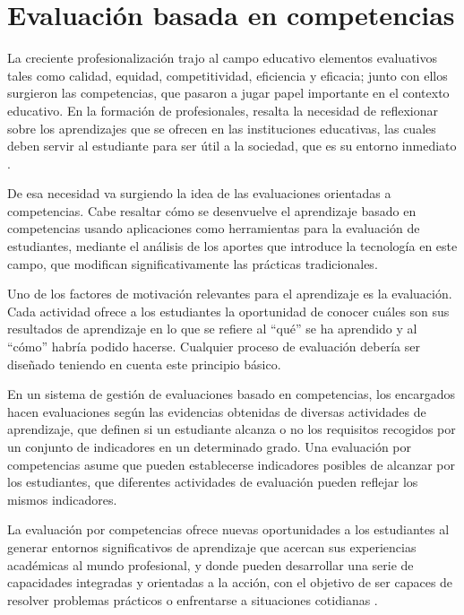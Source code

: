 \section{Evaluación basada en competencias}
La creciente profesionalización trajo al campo educativo elementos evaluativos tales como calidad, equidad, competitividad, eficiencia y eficacia; junto con ellos surgieron las competencias, que pasaron a jugar papel importante en el contexto educativo. En la formación de profesionales, resalta la necesidad de reflexionar sobre los aprendizajes que se ofrecen en las instituciones educativas, las cuales deben servir al estudiante para ser útil a la sociedad, que es su entorno inmediato \citep{kuh_using_2015}.

De esa necesidad va surgiendo la idea de las evaluaciones orientadas a competencias. Cabe resaltar cómo se desenvuelve el aprendizaje basado en competencias usando aplicaciones como herramientas para la evaluación de estudiantes, mediante el análisis de los aportes que introduce la tecnología en este campo, que modifican significativamente las prácticas tradicionales\citep{carriveau_connecting_2016}.

Uno de los factores de motivación relevantes para el aprendizaje es la evaluación. Cada actividad ofrece a los estudiantes la oportunidad de conocer cuáles son sus resultados de aprendizaje en lo que se refiere al \enquote{qué} se ha aprendido y al \enquote{cómo} habría podido hacerse. Cualquier proceso de evaluación debería ser diseñado teniendo en cuenta este principio básico.

En un sistema de gestión de evaluaciones basado en competencias, los encargados hacen evaluaciones según las evidencias obtenidas de diversas actividades de aprendizaje, que definen si un estudiante alcanza o no los requisitos recogidos por un conjunto de indicadores en un determinado grado. Una evaluación por competencias asume que pueden establecerse indicadores posibles de alcanzar por los estudiantes, que diferentes actividades de evaluación pueden reflejar los mismos indicadores\citep{barrio_minton_evaluating_2016}.

La evaluación por competencias ofrece nuevas oportunidades a los estudiantes al generar entornos significativos de aprendizaje que acercan sus experiencias académicas al mundo profesional, y donde pueden desarrollar una serie de capacidades integradas y orientadas a la acción, con el objetivo de ser capaces de resolver problemas prácticos o enfrentarse a situaciones cotidianas \citep{carriveau_connecting_2016}.